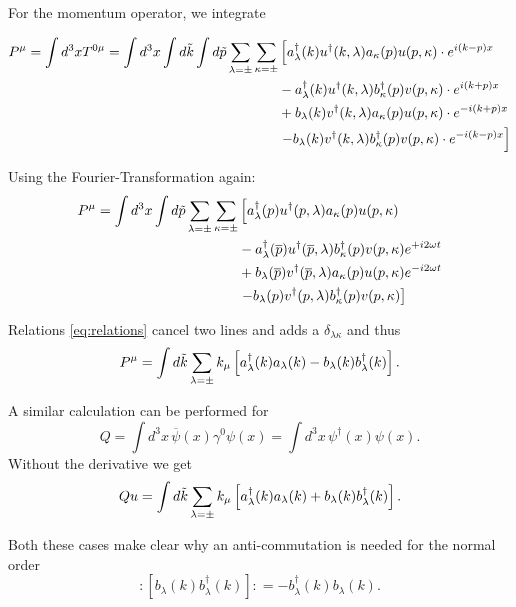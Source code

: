 For the momentum operator, we integrate

\begin{align}
    P^\mu = \int d^3 x T^{0\mu} 
    =\int d^3x \int d \Tilde{k} \int d \Tilde{p} \sum_{\lambda = \pm} \sum_{\kappa = \pm}
    &\left[
    a^\dagger_\lambda(k) u^\dagger(k, \lambda) a_\kappa(p) u(p, \kappa) \cdot e^{i(k-p)x} \right.\\
   &-a^\dagger_\lambda(k) u^\dagger(k, \lambda) b^\dagger_\kappa(p) v(p, \kappa) \cdot e^{i(k+p)x} \\
   &+b_\lambda(k) v^\dagger(k, \lambda) a_\kappa(p) u(p, \kappa) \cdot e^{-i(k+p)x}\\
   &\left. -b_\lambda(k) v^\dagger(k, \lambda) b^\dagger_\kappa(p) v(p, \kappa) \cdot e^{-i(k-p)x}
        \right]
\end{align}

Using the Fourier-Transformation again:
\begin{align}
        P^\mu = \int d^3x  \int d \Tilde{p} \sum_{\lambda = \pm} \sum_{\kappa = \pm}
    &\left[
    a^\dagger_\lambda({p}) u^\dagger({p}, \lambda) a_\kappa(p) u(p, \kappa)  \right.\\
   &-a^\dagger_\lambda(\overline{p}) u^\dagger(\overline{p}, \lambda) b^\dagger_\kappa(p) v(p, \kappa) e^{+i2\omega t}  \\
   &+b_\lambda(\overline{p}) v^\dagger(\overline{p}, \lambda) a_\kappa(p) u(p, \kappa) e^{-i2\omega t}\\
   &\left. -b_\lambda(p) v^\dagger(p, \lambda) b^\dagger_\kappa(p) v(p, \kappa) 
        \right]
\end{align}

Relations \ref{eq:relations} cancel two lines and adds a $\delta_{\lambda \kappa}$ and thus
\begin{equation}
    P^\mu = \int d \Tilde{k} \sum_{\lambda = \pm} k_\mu \left[ a^\dagger_\lambda(k)  a_\lambda(k) - b_\lambda(k)  b^\dagger_\lambda(k) \right].
\end{equation}

A similar calculation can be performed for 
\begin{equation}
    Q = \int d^3 x \,\overline{\psi}(x) \gamma^0 \psi(x) = \int d^3 x \, \psi^\dagger(x) \psi(x).
\end{equation}
Without the derivative we get 
\begin{equation}
        Qu = \int d \Tilde{k} \sum_{\lambda = \pm} k_\mu \left[ a^\dagger_\lambda(k)  a_\lambda(k) + b_\lambda(k)  b^\dagger_\lambda(k) \right].
\end{equation}

Both these cases make clear why an anti-commutation is needed for the normal order
\begin{equation}
    :\left[  b_\lambda(k)  b^\dagger_\lambda(k) \right]: = - b^\dagger_\lambda(k) b_\lambda(k).
\end{equation}
